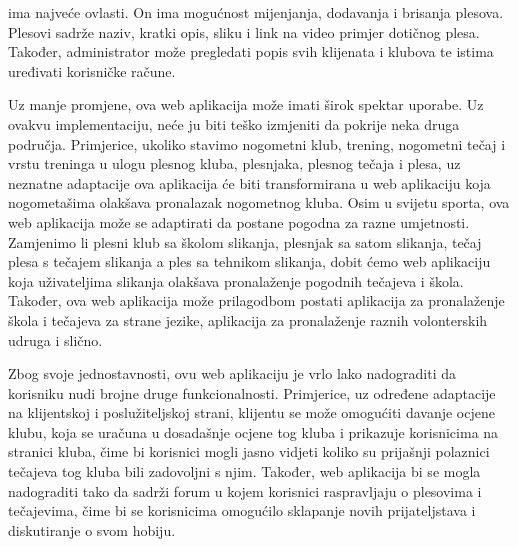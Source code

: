  ima najveće ovlasti. On ima mogućnost mijenjanja, dodavanja i brisanja plesova. Plesovi sadrže naziv, kratki opis, sliku i link na video primjer dotičnog plesa. Također, administrator može pregledati popis svih klijenata i klubova te istima uređivati korisničke račune.

Uz manje promjene, ova web aplikacija može imati širok spektar uporabe. Uz ovakvu implementaciju, neće ju biti teško izmjeniti da pokrije neka druga područja. Primjerice, ukoliko stavimo nogometni klub, trening, nogometni tečaj i vrstu treninga u ulogu plesnog kluba, plesnjaka, plesnog tečaja i plesa, uz neznatne adaptacije ova aplikacija će biti transformirana u web aplikaciju koja nogometašima olakšava pronalazak nogometnog kluba. Osim u svijetu sporta, ova web aplikacija može se adaptirati da postane pogodna za razne umjetnosti. Zamjenimo li plesni klub sa školom slikanja, plesnjak sa satom slikanja, tečaj plesa s tečajem slikanja a ples sa tehnikom slikanja, dobit ćemo web aplikaciju koja uživateljima slikanja olakšava pronalaženje pogodnih tečajeva i škola. Također, ova web aplikacija može prilagodbom postati aplikacija za pronalaženje škola i tečajeva za strane jezike, aplikacija za pronalaženje raznih volonterskih udruga i slično.

Zbog svoje jednostavnosti, ovu web aplikaciju je vrlo lako nadograditi da korisniku nudi brojne druge funkcionalnosti. Primjerice, uz određene adaptacije na klijentskoj i poslužiteljskoj strani, klijentu se može omogućiti davanje ocjene klubu, koja se uračuna u dosadašnje ocjene tog kluba i prikazuje korisnicima na stranici kluba, čime bi korisnici mogli jasno vidjeti koliko su prijašnji polaznici tečajeva tog kluba bili zadovoljni s njim. Također, web aplikacija bi se mogla nadograditi tako da sadrži forum u kojem korisnici raspravljaju o plesovima i tečajevima, čime bi se korisnicima omogućilo sklapanje novih prijateljstava i diskutiranje o svom hobiju.		
	
